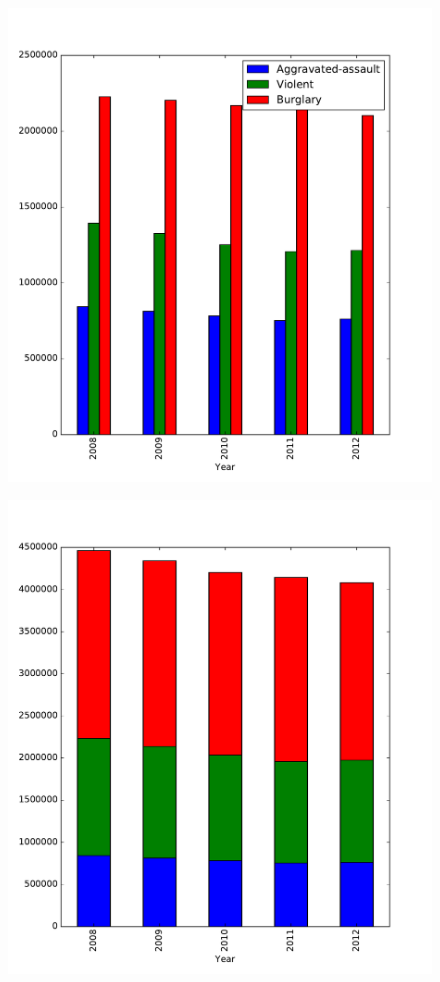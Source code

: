 \documentclass[12pt]{article}
\begin{document}
\begin{figure}[H] %
    \centering
    \begin{minipage}[b]{.48\textwidth}
    	 \includegraphics[width=\textwidth]{bar1.pdf}
	 \label{fig:overlap_hist}
    \end{minipage}
    \quad
    \begin{minipage}[b]{.48\textwidth}
    	\includegraphics[width=\textwidth]{bar2.pdf}
	\label{fig:stacked_hist}
    \end{minipage}
\end{figure}
\end{document}

